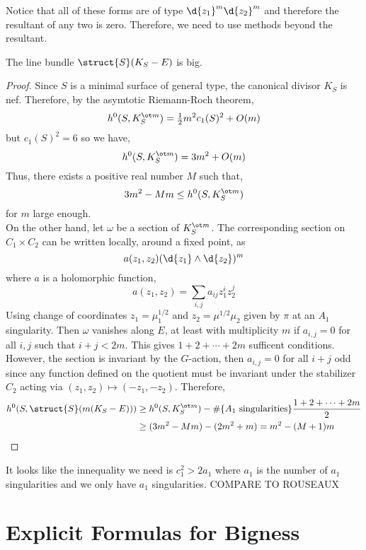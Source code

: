 \documentclass[12pt]{article}
\begin{document}
\begin{rmk}
Notice that all of these forms are of type $\d{z_1}^m \d{z_2}^m$ and therefore the resultant of any two is zero. Therefore, we need to use methods beyond the resultant. 
\end{rmk}


\begin{prop}
The line bundle $\struct{S}(K_S - E)$ is big.
\end{prop}

\begin{proof}
Since $S$ is a minimal surface of general type, the canonical divisor $K_S$ is nef. Therefore, by the asymtotic Riemann-Roch theorem,
\[ h^0(S, K_S^{\ot m}) = \tfrac{1}{2} m^2 c_1(S)^2 + O(m) \]
but $c_1(S)^2 = 6$ so we have,
\[ h^0(S, K_S^{\ot m}) = 3 m^2 + O(m) \]
Thus, there exists a positive real number $M$ such that,
\[ 3 m^2 - M m \le h^0(S, K_S^{\ot m}) \]
for $m$ large enough.
\bigskip\\
On the other hand, let $\omega$ be a section of $K_S^{\ot m}$. The corresponding section on $C_1 \times C_2$ can be written locally, around a fixed point, as
\[ a(z_1, z_2) (\d{z_1} \wedge \d{z_2})^m \]
where $a$ is a holomorphic function,
\[ a(z_1, z_2) = \sum_{i,j} a_{ij} z_1^i z_2^j \]
Using change of coordinates $z_1 = \mu_1^{1/2}$ and $z_2 = \mu^{1/2} \mu_2$ given by $\pi$ at an $A_1$ singularity. Then $\omega$ vanishes along $E$, at least with multiplicity $m$ if $a_{i,j} = 0$ for all $i,j$ such that $i + j < 2m$. This gives $1 + 2 + \cdots + 2m$ sufficent conditions. However, the section is invariant by the $G$-action, then $a_{i,j} = 0$ for all $i + j$ odd since any function defined on the quotient must be invariant under the stabilizer $C_2$ acting via $(z_1, z_2) \mapsto (-z_1, -z_2)$. Therefore, 
\begin{align*}
h^0(S, \struct{S}(m(K_S - E))) & \ge h^0(S, K_S^{\ot m}) - \# \{ A_1 \text{ singularities} \} \frac{1 + 2 + \cdots + 2 m}{2} 
\\ 
& \ge (3 m ^2 - Mm) - (2m^2 + m) = m^2 - (M+1)m 
\end{align*}
\end{proof}

It looks like the innequality we need is $c_1^2 > 2 a_1$ where $a_1$ is the number of $a_1$ singularities and we only have $a_1$ singularities. {\color{red} COMPARE TO ROUSEAUX}


\section{Explicit Formulas for Bigness}
\end{document}
